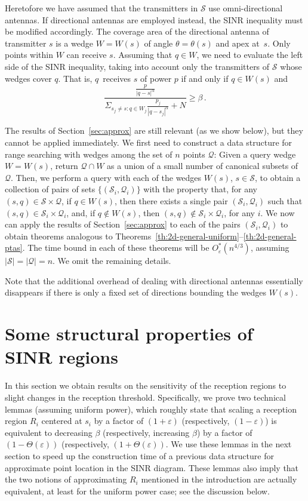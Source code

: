 \documentclass[11pt]{article}
\theoremstyle{remark}
\def\Q{\mathcal{Q}}
\def\S{\mathcal{S}}
\let\eps\varepsilon
\begin{document}
Heretofore
we have assumed that the transmitters in $\S$ use omni-directional antennas.  If directional antennas are employed instead, the SINR inequality must be modified accordingly.
The coverage area of the directional antenna of transmitter $s$ is a wedge $W=W(s)$ of angle $\theta=\theta(s)$ and apex at~$s$. 
Only points within $W$ can receive $s$.
Assuming that $q \in W$, 
we need to evaluate the left side of the SINR inequality, taking into account only the transmitters of $\S$ whose wedges cover $q$.
That is, $q$~receives $s$ of power $p$ if and only if $q \in W(s)$ and 
\[
\frac{\frac{p}{|q-s|^\alpha}}{\Sigma_{s_j \ne s:q \in W_j}{\frac{p_j}{|q-s_j|^\alpha}} + N} \geq \beta \, .  
\]

The results of Section~\ref{sec:approx} are still relevant (as we show below), but they cannot be applied immediately.  We first need to construct a data structure for range searching with wedges among the set of $n$ points $\Q$:  Given a query wedge $W=W(s)$, return $\Q \cap W$ as a union of a small number of canonical subsets of $\Q$. Then, we perform a query with each of the wedges $W(s)$, $s \in \S$, to obtain a collection of pairs of sets $\{(\S_i,\Q_i)\}$ with the property that,
for any $(s,q) \in \S \times \Q$, if $q \in W(s)$, then there exists a single pair $(\S_i, \Q_i)$ such that $(s,q) \in \S_i \times \Q_i$, and, if $q \notin W(s)$, then $(s,q) \notin \S_i \times \Q_i$, for any $i$. We now can apply the results of Section~\ref{sec:approx} to each of the pairs $(\S_i,\Q_i)$ to obtain theorems analogous to Theorems~\ref{th:2d-general-uniform}--\ref{th:2d-general-ptas}. The time bound in each of these theorems will be $O^*_\eps(n^{4/3})$, assuming $|\S|=|\Q|=n$. We omit the remaining details.  

Note that the additional overhead of dealing with directional antennas essentially disappears if there is only a fixed set of directions bounding the wedges $W(s)$.






\section{Some structural properties of SINR regions}
\label{sec:structural}

In this section we obtain results on the sensitivity of the reception regions to slight changes in the reception threshold. Specifically, we prove two technical lemmas (assuming uniform power), which roughly state that scaling a reception region $R_i$ centered at $s_i$ by a factor of $(1+\eps)$ (respectively, $(1-\eps)$) is equivalent to decreasing $\beta$ (respectively, increasing $\beta$) by a factor of $(1-\Theta(\eps))$ (respectively, $(1+\Theta(\eps))$. We use these lemmas in the next section to speed up the construction time of a previous data structure for approximate point location in the SINR diagram. These lemmas also imply that the two notions of approximating $R_i$ mentioned in the introduction are actually equivalent, at least for the uniform power case; see the discussion below.
\end{document}
